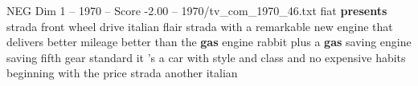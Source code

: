 \begin{textsample}{NEG Dim 1 – 1970 – Score -2.00 – 1970/tv\_com\_1970\_46.txt}  \label{ex:f1_neg_061}
fiat \textbf{presents} strada front wheel drive italian flair strada with a remarkable new engine that delivers better mileage better than the \textbf{gas} engine rabbit plus a \textbf{gas} saving engine saving fifth gear standard it 's a car with style and class and no expensive habits beginning with the price strada another italian

\end{textsample}
